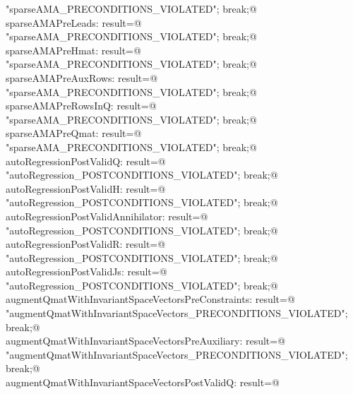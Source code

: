 \documentclass[12pt]{article}
\begin{document}
\begin{flushleft}
\begin{minipage}{\linewidth}
\begin{list}{}{}
\mbox{}\verb@  "sparseAMA_PRECONDITIONS_VIOLATED"; break;@\\
\mbox{}\verb@case  sparseAMAPreLeads: result=@\\
\mbox{}\verb@  "sparseAMA_PRECONDITIONS_VIOLATED"; break;@\\
\mbox{}\verb@case  sparseAMAPreHmat: result=@\\
\mbox{}\verb@  "sparseAMA_PRECONDITIONS_VIOLATED"; break;@\\
\mbox{}\verb@case  sparseAMAPreAuxRows: result=@\\
\mbox{}\verb@  "sparseAMA_PRECONDITIONS_VIOLATED"; break;@\\
\mbox{}\verb@case  sparseAMAPreRowsInQ: result=@\\
\mbox{}\verb@  "sparseAMA_PRECONDITIONS_VIOLATED"; break;@\\
\mbox{}\verb@case  sparseAMAPreQmat: result=@\\
\mbox{}\verb@  "sparseAMA_PRECONDITIONS_VIOLATED"; break;@\\
\mbox{}\verb@case  autoRegressionPostValidQ: result=@\\
\mbox{}\verb@  "autoRegression_POSTCONDITIONS_VIOLATED"; break;@\\
\mbox{}\verb@case  autoRegressionPostValidH: result=@\\
\mbox{}\verb@  "autoRegression_POSTCONDITIONS_VIOLATED"; break;@\\
\mbox{}\verb@case  autoRegressionPostValidAnnihilator: result=@\\
\mbox{}\verb@  "autoRegression_POSTCONDITIONS_VIOLATED"; break;@\\
\mbox{}\verb@case  autoRegressionPostValidR: result=@\\
\mbox{}\verb@  "autoRegression_POSTCONDITIONS_VIOLATED"; break;@\\
\mbox{}\verb@case  autoRegressionPostValidJs: result=@\\
\mbox{}\verb@  "autoRegression_POSTCONDITIONS_VIOLATED"; break;@\\
\mbox{}\verb@case  augmentQmatWithInvariantSpaceVectorsPreConstraints: result=@\\
\mbox{}\verb@  "augmentQmatWithInvariantSpaceVectors_PRECONDITIONS_VIOLATED"; break;@\\
\mbox{}\verb@case  augmentQmatWithInvariantSpaceVectorsPreAuxiliary: result=@\\
\mbox{}\verb@  "augmentQmatWithInvariantSpaceVectors_PRECONDITIONS_VIOLATED"; break;@\\
\mbox{}\verb@case  augmentQmatWithInvariantSpaceVectorsPostValidQ: result=@\\

\end{list}
\end{minipage}
\end{flushleft}
\end{document}
